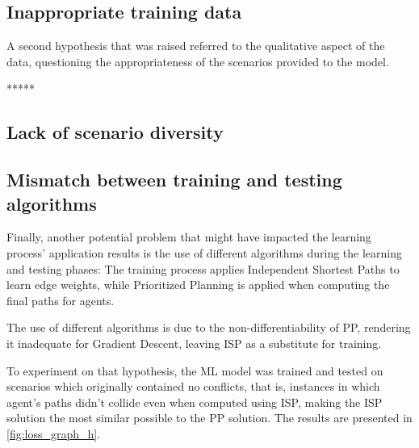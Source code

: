 \subsection{Inappropriate training data}

A second hypothesis that was raised referred to the qualitative aspect of the data, questioning the appropriateness of the scenarios provided to the model.

*****

\subsection{Lack of scenario diversity}

\subsection{Mismatch between training and testing algorithms}

Finally, another potential problem that might have impacted the learning process' application results is the use of different algorithms during the learning and testing phases: The training process applies Independent Shortest Paths to learn edge weights, while Prioritized Planning is applied when computing the final paths for agents.

The use of different algorithms is due to the non-differentiability of PP, rendering it inadequate for Gradient Descent, leaving ISP as a substitute for training.

To experiment on that hypothesis, the ML model was trained and tested on scenarios which originally contained no conflicts, that is, instances in which agent's paths didn't collide even when computed using ISP, making the ISP solution the most similar possible to the PP solution. The results are presented in \ref{fig:loss_graph_h}.


